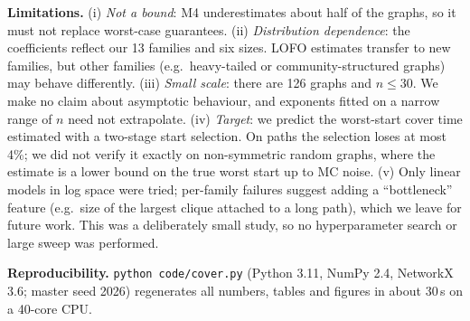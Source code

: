 \documentclass{article} %
\begin{document}
\textbf{Limitations.} (i) \emph{Not a bound}: M4 underestimates about half of the graphs, so it must not replace worst-case guarantees. (ii) \emph{Distribution dependence}: the coefficients reflect our 13 families and six sizes. LOFO estimates transfer to new families, but other families (e.g.\ heavy-tailed or community-structured graphs) may behave differently. (iii) \emph{Small scale}: there are 126 graphs and $n\le30$. We make no claim about asymptotic behaviour, and exponents fitted on a narrow range of $n$ need not extrapolate. (iv) \emph{Target}: we predict the worst-start cover time estimated with a two-stage start selection. On paths the selection loses at most 4\%; we did not verify it exactly on non-symmetric random graphs, where the estimate is a lower bound on the true worst start up to MC noise. (v) Only linear models in log space were tried; per-family failures suggest adding a ``bottleneck'' feature (e.g.\ size of the largest clique attached to a long path), which we leave for future work. This was a deliberately small study, so no hyperparameter search or large sweep was performed.

\textbf{Reproducibility.} \texttt{python code/cover.py} (Python 3.11, NumPy 2.4, NetworkX 3.6; master seed 2026) regenerates all numbers, tables and figures in about 30\,s on a 40-core CPU.



\end{document}
